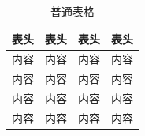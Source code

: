 {
\songti{}  %
\begin{table}[htbp]
  \centering
  \caption{普通表格}
  \label{tab:pinci}
    \begin{tabularx}{0.9\textwidth} { 
        >{\centering\arraybackslash}X 
        >{\centering\arraybackslash}X 
        >{\centering\arraybackslash}X 
        >{\centering\arraybackslash}X 
        }
        \toprule
        表头 & 表头 & 表头 & 表头 \\
        \midrule
        内容 & 内容 & 内容 & 内容 \\
        内容 & 内容 & 内容 & 内容 \\
        内容 & 内容 & 内容 & 内容 \\
        内容 & 内容 & 内容 & 内容 \\
        \bottomrule
    \end{tabularx}
\end{table}
}

